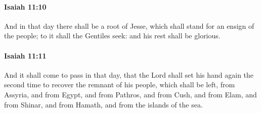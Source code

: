 		\paragraph{Isaiah 11:10} %
			\label{ISAIAH-11-10}

			And in that day there shall be a root of Jesse, which shall stand for an ensign of the people; to it shall the Gentiles seek: and his rest shall be glorious.


		\paragraph{Isaiah 11:11} %
			\label{ISAIAH-11-11}

			And it shall come to pass in that day, that the Lord shall set his hand again the second time to recover the remnant of his people, which shall be left, from Assyria, and from Egypt, and from Pathros, and from Cush, and from Elam, and from Shinar, and from Hamath, and from the islands of the sea.

